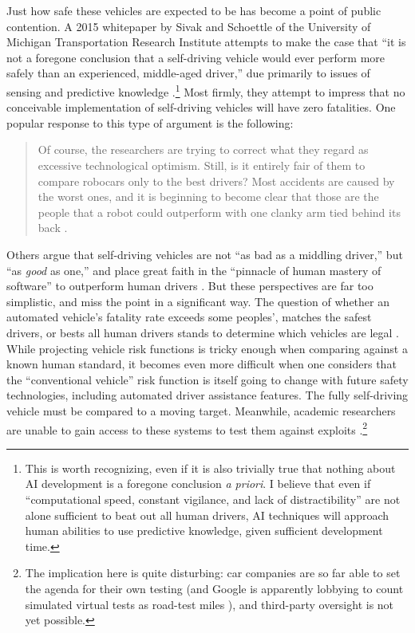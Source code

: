Just how safe these vehicles are expected to be has become a point of
public contention. A 2015 whitepaper by Sivak and Schoettle of the
University of Michigan Transportation Research Institute attempts to
make the case that ``it is not a foregone conclusion that a
self-driving vehicle would ever perform more safely than an
experienced, middle-aged driver,'' due primarily to issues of sensing and
predictive knowledge \cite[p. i]{SivakSchoettle}.\footnote{This is worth
recognizing, even if it is also trivially true that nothing about AI
development is a foregone conclusion \emph{a priori}. I believe that
even if ``computational speed, constant vigilance, and lack of
distractibility'' are not alone sufficient to beat out all human
drivers, \cite[p. 4]{SivakSchoettle} AI techniques will approach human abilities to use predictive
knowledge, given sufficient development time.} Most firmly, they
attempt to impress that no conceivable implementation of self-driving
vehicles will have zero fatalities. One popular response to this type of
argument is the following: 
\begin{quote}Of course, the researchers are trying to correct what they regard as
excessive technological optimism. Still, is it entirely fair of them
to compare robocars only to the best drivers? Most accidents are
caused by the worst ones, and it is beginning to become clear that
those are the people that a robot could outperform with one clanky
arm tied behind its back \cite{rossSafety}.\end{quote} 
Others argue that self-driving vehicles are not ``as bad as a middling
driver,'' but ``as \emph{good} as one,'' and place great faith in the
``pinnacle of human mastery of software'' to outperform human drivers \cite{templetonB}.
But these perspectives are far too simplistic, and miss the point in a
significant way. The question of whether an
automated vehicle's fatality rate exceeds some peoples', matches the
safest drivers, or bests all human drivers stands to determine which
vehicles are legal \cite[p. 6]{SivakSchoettle}. While projecting vehicle
risk functions is tricky enough when comparing against a known human
standard, it becomes even more difficult when one considers that the
``conventional vehicle'' risk function is itself going to change with
future safety technologies, including automated driver assistance
features. The fully self-driving vehicle must be compared to a moving
target. Meanwhile, academic researchers are unable to gain access to
these systems to test them against exploits
\cite{madrigalHack}.\footnote{The
implication here is quite disturbing: car companies are so far able to
set the agenda for their own testing (and Google is apparently
lobbying to count simulated virtual tests as road-test miles
\cite{harrisVirtual}),
and third-party oversight is not yet possible.}

